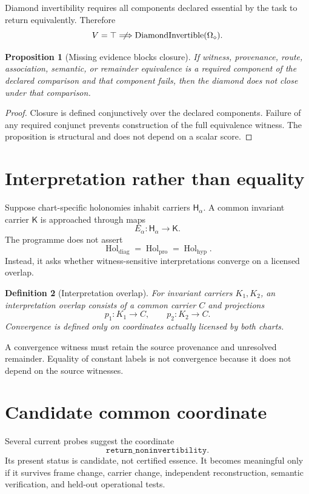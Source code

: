 \documentclass[12pt,openany]{book}
\newtheorem{definition}{Definition}[chapter]
\newtheorem{proposition}[definition]{Proposition}
\theoremstyle{remark}
\DeclareMathOperator{\Hol}{Hol}
\newcommand{\DiamondHol}{\Omega_{\diamond}}
\begin{document}
Diamond invertibility requires all components declared essential by the task to return equivalently. Therefore
\[
V=\top
\centernot\Longrightarrow
\operatorname{DiamondInvertible}(\DiamondHol).
\]

\begin{proposition}[Missing evidence blocks closure]
If witness, provenance, route, association, semantic, or remainder equivalence is a required component of the declared comparison and that component fails, then the diamond does not close under that comparison.
\end{proposition}

\begin{proof}
Closure is defined conjunctively over the declared components. Failure of any required conjunct prevents construction of the full equivalence witness. The proposition is structural and does not depend on a scalar score.
\end{proof}

\section{Interpretation rather than equality}
Suppose chart-specific holonomies inhabit carriers $\mathsf H_\alpha$. A common invariant carrier $\mathsf K$ is approached through maps
\[
E_\alpha:\mathsf H_\alpha\to\mathsf K.
\]
The programme does not assert
\[
\Hol_{\mathrm{diag}}
=
\Hol_{\mathrm{pro}}
=
\Hol_{\mathrm{hyp}}.
\]
Instead, it asks whether witness-sensitive interpretations converge on a licensed overlap.

\begin{definition}[Interpretation overlap]
For invariant carriers $K_1,K_2$, an interpretation overlap consists of a common carrier $C$ and projections
\[
p_1:K_1\to C,
\qquad
p_2:K_2\to C.
\]
Convergence is defined only on coordinates actually licensed by both charts.
\end{definition}

A convergence witness must retain the source provenance and unresolved remainder. Equality of constant labels is not convergence because it does not depend on the source witnesses.

\section{Candidate common coordinate}
Several current probes suggest the coordinate
\[
\texttt{return\_noninvertibility}.
\]
Its present status is candidate, not certified essence. It becomes meaningful only if it survives frame change, carrier change, independent reconstruction, semantic verification, and held-out operational tests.
\end{document}
